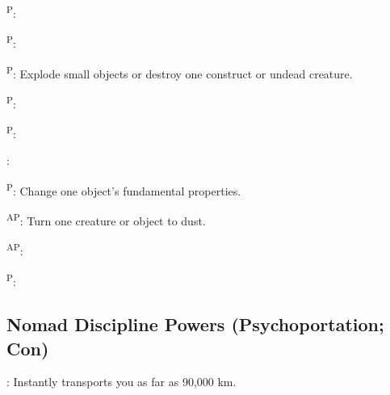 \begin{enumerate*}
      \textsuperscript{P}:

\item {}\textsuperscript{P}:

      \textsuperscript{P}: Explode small objects or destroy one construct or undead creature.

      \textsuperscript{P}:

      \textsuperscript{P}:

\item {}:

      \textsuperscript{P}: Change one object's fundamental properties.

\item {}\textsuperscript{AP}: Turn one creature or object to dust.

\item {}\textsuperscript{AP}:

\item {}\textsuperscript{P}:
\end{enumerate*}



\subsection{Nomad Discipline Powers {\normalsize(Psychoportation; Con)}}
\begin{enumerate*}
\item
\item
\item
\item
\item {}: Instantly transports you as far as 90,000 km.
\item
\item
\item
\item
\end{enumerate*}



